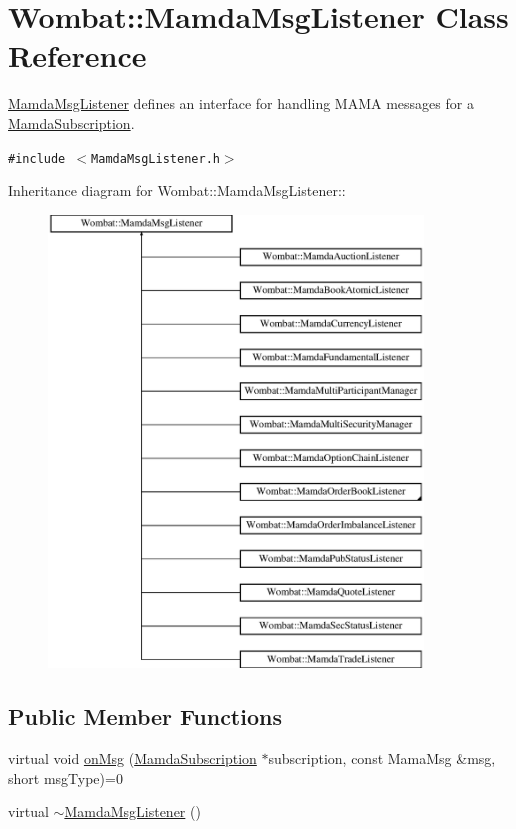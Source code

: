 \hypertarget{classWombat_1_1MamdaMsgListener}{
\section{Wombat::Mamda\-Msg\-Listener Class Reference}
\label{classWombat_1_1MamdaMsgListener}
}
\hyperlink{classWombat_1_1MamdaMsgListener}{Mamda\-Msg\-Listener} defines an interface for handling MAMA messages for a \hyperlink{classWombat_1_1MamdaSubscription}{Mamda\-Subscription}.  


{\tt \#include $<$Mamda\-Msg\-Listener.h$>$}

Inheritance diagram for Wombat::Mamda\-Msg\-Listener::\begin{figure}[H]
\begin{center}
\leavevmode
\includegraphics[height=12cm]{classWombat_1_1MamdaMsgListener}
\end{center}
\end{figure}
\subsection*{Public Member Functions}
\begin{CompactItemize}
\item 
virtual void \hyperlink{classWombat_1_1MamdaMsgListener_c700829ebcce095b95b8b67b39a1c67d}{on\-Msg} (\hyperlink{classWombat_1_1MamdaSubscription}{Mamda\-Subscription} $\ast$subscription, const Mama\-Msg \&msg, short msg\-Type)=0
\item 
virtual \hyperlink{classWombat_1_1MamdaMsgListener_dacd39cbca03cbb38e6a6046a3e6cc43}{$\sim$Mamda\-Msg\-Listener} ()
\end{CompactItemize}


